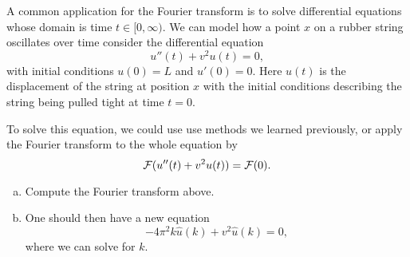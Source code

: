 \documentclass[12pt]{article} %
\begin{document}
%

\begin{problem}
A common application for the Fourier transform is to solve differential equations whose domain is time $t\in [0,\infty)$. We can model how a point $x$ on a rubber string oscillates over time consider the differential equation
\[
u''(t)+v^2u(t)=0,
\]
with initial conditions $u(0)=L$ and $u'(0)=0$. Here $u(t)$ is the displacement of the string at position $x$ with the initial conditions describing the string being pulled tight at time $t=0$.
\begin{figure}[H]
	\centering
	\def\svgwidth{\columnwidth}
	
\end{figure}
To solve this equation, we could use use methods we learned previously, or apply the Fourier transform to the whole equation by
\[
\mathcal{F}(u''(t)+v^2u(t))=\mathcal{F}(0).
\]
\begin{enumerate}[(a)]
	\item Compute the Fourier transform above.
	\item One should then have a new equation
	\[
	-4\pi^2 k\hat{u}(k)+v^2\hat{u}(k)=0,
	\]
	where we can solve for $k$. 
\end{enumerate}
\end{problem}
\end{document}
